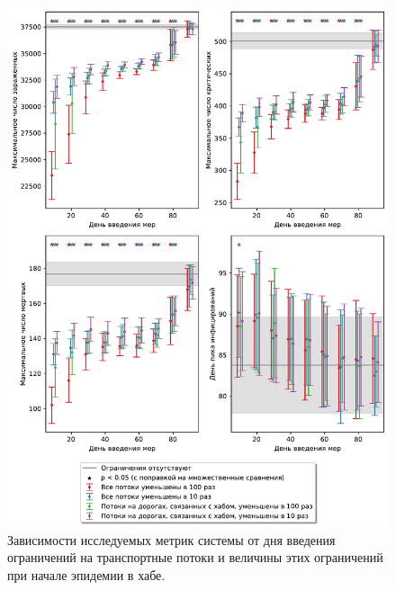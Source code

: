 \documentclass[a4paper,12pt]{article} %
\begin{document}
\begin{figure}[H]
    \centering
    \includegraphics[width=\linewidth]{images/satellites_hists0.pdf}
    \caption{Зависимости исследуемых метрик системы от дня введения ограничений на транспортные потоки и величины этих ограничений при начале эпидемии в хабе.}
    \label{pic:satellites_hists0}
\end{figure}
\end{document}
